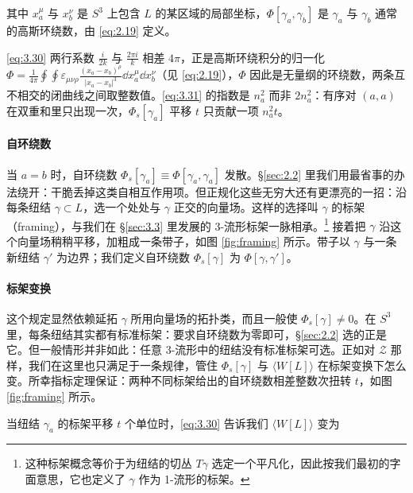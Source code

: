 其中 $x_a^\mu$ 与 $x_b^\nu$ 是 $S^3$ 上包含 $L$ 的某区域的局部坐标，$\Phi[\gamma_a,\gamma_b]$ 是 $\gamma_a$ 与 $\gamma_b$ 通常的高斯环绕数，由 \eqref{eq:2.19} 定义。

\begin{yizhu}[易错点]
\eqref{eq:3.30} 两行系数 $\frac{i}{2k}$ 与 $\frac{2\pi i}{k}$ 相差 $4\pi$，正是高斯环绕积分的归一化 $\Phi=\frac{1}{4\pi}\oint\oint\varepsilon_{\mu\nu\rho}\frac{(x_a-x_b)^\rho}{|x_a-x_b|^3}\dd x_a^\mu\dd x_b^\nu$（见 \eqref{eq:2.19}），$\Phi$ 因此是无量纲的环绕数，两条互不相交的闭曲线之间取整数值。\eqref{eq:3.31} 的指数是 $n_a^2$ 而非 $2n_a^2$：有序对 $(a,a)$ 在双重和里只出现一次，$\Phi_s[\gamma_a]$ 平移 $t$ 只贡献一项 $n_a^2t$。
\end{yizhu}

\paragraph{自环绕数} 当 $a=b$ 时，自环绕数 $\Phi_s[\gamma_a]\equiv\Phi[\gamma_a,\gamma_a]$ 发散。\S\ref{sec:2.2} 里我们用最省事的办法绕开：干脆丢掉这类自相互作用项。但正规化这些无穷大还有更漂亮的一招：沿每条纽结 $\gamma\subset L$，选一个处处与 $\gamma$ 正交的向量场。这样的选择叫 $\gamma$ 的标架（framing），与我们在 \S\ref{sec:3.3} 里发展的 3-流形标架一脉相承。\footnote{这种标架概念等价于为纽结的切丛 $T\gamma$ 选定一个平凡化，因此按我们最初的字面意思，它也定义了 $\gamma$ 作为 1-流形的标架。} 接着把 $\gamma$ 沿这个向量场稍稍平移，加粗成一条带子，如图 \ref{fig:framing} 所示。带子以 $\gamma$ 与一条新纽结 $\gamma'$ 为边界；我们定义自环绕数 $\Phi_s[\gamma]$ 为 $\Phi[\gamma,\gamma']$。

\paragraph{标架变换} 这个规定显然依赖延拓 $\gamma$ 所用向量场的拓扑类，而且一般使 $\Phi_s[\gamma]\neq0$。在 $S^3$ 里，每条纽结其实都有标准标架：要求自环绕数为零即可，\S\ref{sec:2.2} 选的正是它。但一般情形并非如此：任意 3-流形中的纽结没有标准标架可选。正如对 $\mathcal{Z}$ 那样，我们在这里也只满足于一条规律，管住 $\Phi_s[\gamma]$ 与 $\langle W[L]\rangle$ 在标架变换下怎么变。所幸指标定理保证：两种不同标架给出的自环绕数相差整数次扭转 $t$，如图 \ref{fig:framing} 所示。

当纽结 $\gamma_a$ 的标架平移 $t$ 个单位时，\eqref{eq:3.30} 告诉我们 $\langle W[L]\rangle$ 变为

